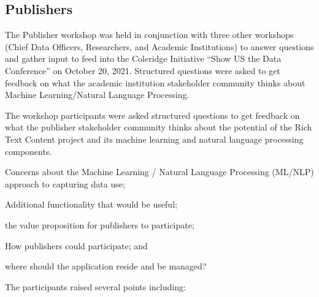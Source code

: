 \documentclass[titlepage, 11pt]{article}
\begin{document}
{\subsection*{Publishers}\label{subsec:publishers}
The Publisher workshop was held in conjunction with three other workshops (Chief Data Officers, Researchers, and Academic Institutions) to answer questions and gather input to feed into the Coleridge Initiative “Show US the Data Conference” on October 20, 2021. Structured questions were asked to get feedback on what the academic institution stakeholder community thinks about Machine Learning/Natural Language Processing. 

The workshop participants were asked structured questions to get feedback on what the publisher stakeholder community thinks about the potential of the Rich Text Content project and its machine learning and natural language processing components. \begin{enumerate*}[label=(\arabic*)]
    \item Concerns about the Machine Learning / Natural Language Processing (ML/NLP) approach to capturing data use; 
    \item Additional functionality that would be useful;
    \item the value proposition for publishers to participate;
    \item How publishers could participate; and 
    \item where should the application reside and be managed?
\end{enumerate*}

The participants raised several points including:

}
\end{document}
